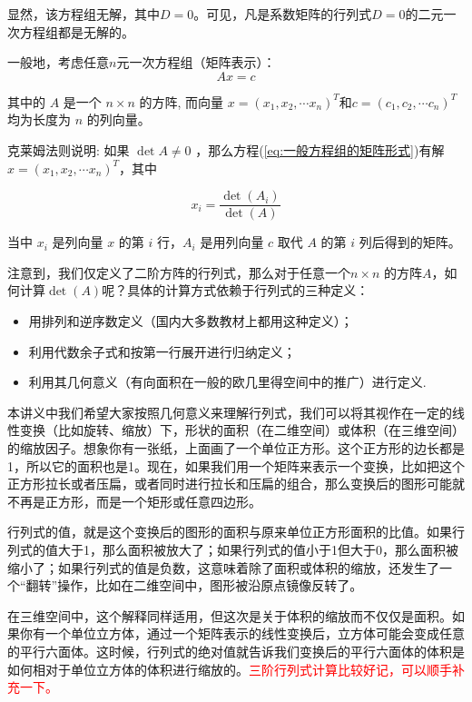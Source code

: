 显然，该方程组无解，其中$D=0$。可见，凡是系数矩阵的行列式$D=0$的二元一次方程组都是无解的。


一般地，考虑任意$n$元一次方程组（矩阵表示）：
\begin{equation}
    A x=c
\label{eq:一般方程组的矩阵形式}
\end{equation}

其中的 $A$ 是一个 $n \times n$ 的方阵, 而向量 $x=\left(x_1, x_2, \cdots x_n\right)^T$和$c=\left(c_1, c_2, \cdots c_n\right)^T$ 均为长度为 $n$ 的列向量。 

克莱姆法则说明: 如果 $\operatorname{det} A \neq 0$ ，那么方程(\ref{eq:一般方程组的矩阵形式})有解$x=\left(x_1, x_2, \cdots x_n\right)^T$，其中

$$
x_i=\frac{\operatorname{det}\left(A_i\right)}{\operatorname{det}(A)}
$$

当中 $x_i$ 是列向量 $x$ 的第 $i$ 行，$A_i$ 是用列向量 $c$ 取代 $A$ 的第 $i$ 列后得到的矩阵。

注意到，我们仅定义了二阶方阵的行列式，那么对于任意一个$n \times n$ 的方阵$A$，如何计算$\operatorname{det}(A)$呢？具体的计算方式依赖于行列式的三种定义：
\begin{itemize}
    \item 用排列和逆序数定义（国内大多数教材上都用这种定义）；
    \item 利用代数余子式和按第一行展开进行归纳定义；
    \item 利用其几何意义（有向面积在一般的欧几里得空间中的推广）进行定义.
\end{itemize}

本讲义中我们希望大家按照几何意义来理解行列式，我们可以将其视作在一定的线性变换（比如旋转、缩放）下，形状的面积（在二维空间）或体积（在三维空间）的缩放因子。想象你有一张纸，上面画了一个单位正方形。这个正方形的边长都是1，所以它的面积也是1。现在，如果我们用一个矩阵来表示一个变换，比如把这个正方形拉长或者压扁，或者同时进行拉长和压扁的组合，那么变换后的图形可能就不再是正方形，而是一个矩形或任意四边形。

行列式的值，就是这个变换后的图形的面积与原来单位正方形面积的比值。如果行列式的值大于1，那么面积被放大了；如果行列式的值小于1但大于0，那么面积被缩小了；如果行列式的值是负数，这意味着除了面积或体积的缩放，还发生了一个“翻转”操作，比如在二维空间中，图形被沿原点镜像反转了。

在三维空间中，这个解释同样适用，但这次是关于体积的缩放而不仅仅是面积。如果你有一个单位立方体，通过一个矩阵表示的线性变换后，立方体可能会变成任意的平行六面体。这时候，行列式的绝对值就告诉我们变换后的平行六面体的体积是如何相对于单位立方体的体积进行缩放的。\textcolor{red}{三阶行列式计算比较好记，可以顺手补充一下。}

